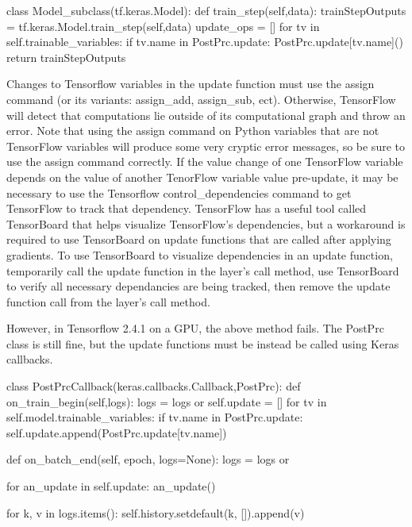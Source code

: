 \begin{code}
class Model_subclass(tf.keras.Model):
    def train_step(self,data):
        trainStepOutputs = tf.keras.Model.train_step(self,data)
        update_ops = []
        for tv in self.trainable_variables:
            if tv.name in PostPrc.update:
                PostPrc.update[tv.name]()
        return trainStepOutputs
\end{code}

Changes to Tensorflow variables in the update function must use the assign command (or its variants: assign\_add, assign\_sub, ect). Otherwise, TensorFlow will detect that computations lie outside of its computational graph and throw an error. Note that using the assign command on Python variables that are not TensorFlow variables will produce some very cryptic error messages, so be sure to use the assign command correctly. If the value change of one TensorFlow variable depends on the value of another TenorFlow variable value pre-update, it may be necessary to use the Tensorflow control\_dependencies command to get TensorFlow to track that dependency. TensorFlow has a useful tool called TensorBoard that helps visualize TensorFlow's dependencies, but a workaround is required to use TensorBoard on update functions that are called after applying gradients. To use TensorBoard to visualize dependencies in an update function, temporarily call the update function in the layer's call method, use TensorBoard to verify all necessary dependancies are being tracked, then remove the update function call from the layer's call method.

However, in Tensorflow 2.4.1 on a GPU, the above method fails. The PostPrc class is still fine, but the update functions must be instead be called using Keras callbacks.
\begin{code}
class PostPrcCallback(keras.callbacks.Callback,PostPrc):
    def on_train_begin(self,logs):
        logs = logs or {}
        self.update = []
        for tv in self.model.trainable_variables:
            if tv.name in PostPrc.update:
                self.update.append(PostPrc.update[tv.name])

    def on_batch_end(self, epoch, logs=None):
        logs = logs or {}

        for an_update in self.update:
            an_update()

        for k, v in logs.items():
            self.history.setdefault(k, []).append(v)
\end{code}

